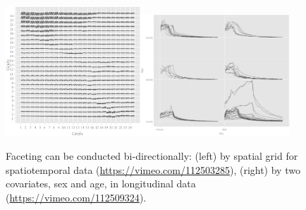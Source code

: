 \documentclass[12pt]{article}
\begin{document}
\begin{figure}[htp]
\begin{center}
\includegraphics[width=0.45\textwidth]{graph/pipeline-24-4}\includegraphics[width=0.5\textwidth]{graph/pipeline-25-2}

\caption{\label{fig:faceting-examples}Faceting can be conducted bi-directionally: (left) by spatial grid for spatiotemporal data (\url{https://vimeo.com/112503285}), (right) by two covariates, sex and age, in longitudinal data (\url{https://vimeo.com/112509324}).}
\end{center}
\end{figure}


\end{document}
